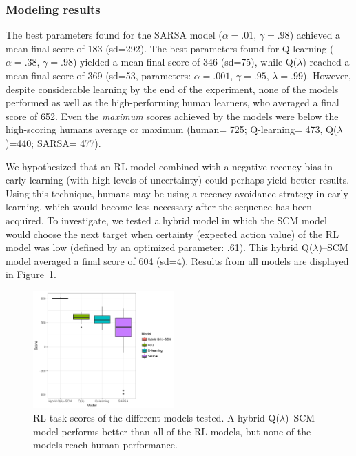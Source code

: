 \documentclass[man,floatsintext]{apa6}
\begin{document}
\subsubsection{Modeling results}
The best parameters found for the SARSA model ($\alpha=.01$, $\gamma=.98$) achieved a mean final score of 183 (sd=292). The best parameters found for Q-learning ($\alpha=.38$, $\gamma=.98$) yielded a mean final score of 346 (sd=75), while Q($\lambda$) reached a mean final score of 369 (sd=53, parameters: $\alpha=.001$, $\gamma=.95$, $\lambda=.99$). However, despite considerable learning by the end of the experiment, none of the models performed as well as the high-performing human learners, who averaged a final score of 652. Even the \emph{maximum} scores achieved by the models were below the high-scoring humans average or maximum (human= 725; Q-learning= 473, Q($\lambda$)=440; SARSA= 477). 

We hypothesized that an RL model combined with a negative recency bias in early learning (with  high levels of uncertainty) could perhaps yield better results. Using this technique, humans may be using a recency avoidance strategy in early learning, which would become less necessary after the sequence has been acquired. To investigate, we tested a hybrid model in which the SCM model would choose the next target when certainty (expected action value) of the RL model was low (defined by an optimized parameter: .61). This hybrid Q($\lambda$)--SCM model averaged a final score of 604 (sd=4). Results from all models are displayed in Figure~\ref{fig:model_results}.

\begin{figure}[h]
  \centering
  \includegraphics[width=0.48\textwidth]{figures/model_results}
  \caption{RL task scores of the different models tested. A hybrid Q($\lambda$)--SCM model performs better than all of the RL models, but none of the models reach human performance.}
  \label{fig:model_results}
\end{figure}
\end{document}
